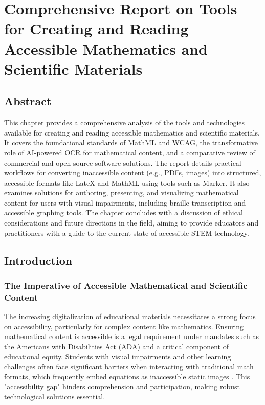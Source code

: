 \chapter{Comprehensive Report on Tools for Creating and Reading Accessible Mathematics and Scientific Materials}\label{ch11:accessible-math}
\raggedright

\section{Abstract}\label{ch11:sec:abstract}
This chapter provides a comprehensive analysis of the tools and technologies available for creating and reading accessible mathematics and scientific materials. It covers the foundational standards of \gls{MathML} and \gls{WCAG}, the transformative role of \gls{AI}-powered \gls{OCR} for mathematical content, and a comparative review of commercial and open-source software solutions. The report details practical workflows for converting inaccessible content (e.g., PDFs, images) into structured, accessible formats like \gls{LateX} and \gls{MathML} using tools such as Marker. It also examines solutions for authoring, presenting, and visualizing mathematical content for users with visual impairments, including braille transcription and accessible graphing tools. The chapter concludes with a discussion of ethical considerations and future directions in the field, aiming to provide educators and practitioners with a guide to the current state of accessible STEM technology.

\section{Introduction}\label{ch11:sec:introduction}
\subsection{The Imperative of Accessible Mathematical and Scientific Content}\label{ch11:ssec:imperative}
The increasing digitalization of educational materials necessitates a strong focus on accessibility, particularly for complex content like mathematics. Ensuring mathematical content is accessible is a legal requirement under mandates such as the Americans with Disabilities Act (ADA) and a critical component of educational equity. Students with visual impairments and other learning challenges often face significant barriers when interacting with traditional math formats, which frequently embed equations as inaccessible static images \supercite{UWAccessibleMath}. This "accessibility gap" hinders comprehension and participation, making robust technological solutions essential.

